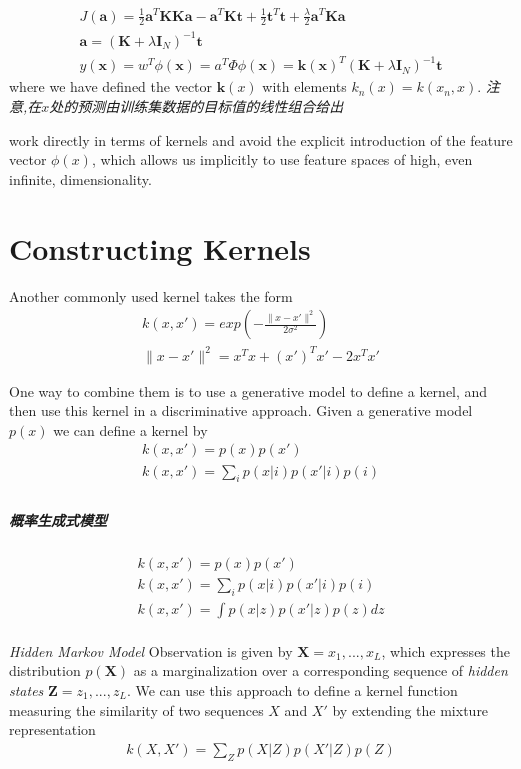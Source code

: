\documentclass[a4paper]{article}
\begin{document}
\begin{align}
J(\mathbf{a}) = \frac{1}{2} \mathbf{a}^T \mathbf{K} \mathbf{K} \mathbf{a} - \mathbf{a}^T
  \mathbf{K} \mathbf{t} + \frac{1}{2} \mathbf{t}^T
  \mathbf{t} + \frac{\lambda}{2} \mathbf{a}^T \mathbf{K} \mathbf{a}
\\
\mathbf{a} = (\mathbf{K} + \lambda \mathit{\mathbf{I}_N})^{-1} \mathbf{t}
\\
y(\mathbf{x}) = w^T\phi(\mathbf{x}) = a^T\Phi\phi(\mathbf{x}) = \mathbf{k}(\mathbf{x})^T (\mathbf{K} + \lambda \mathit{\mathbf{I}_N})^{-1} \mathbf{t}
\end{align}
where we have defined the vector $\mathbf{k}(x)$ with elements $k_n(x) = k(x_n, x)$.
\emph{注意,在$x$处的预测由训练集数据的目标值的线性组合给出}

work directly in terms of kernels and avoid the explicit introduction of the feature vector $\phi(x)$, which allows us implicitly to use feature spaces of high, even infinite, dimensionality.

\section{Constructing Kernels}
Another commonly used kernel takes the form
\begin{align}
k(x, x') = exp(-\frac{\|x-x'\|^2}{2\sigma^2})\\
\|x-x'\|^2 = x^Tx+(x')^Tx' -2x^Tx'
\end{align}

One way to combine them is to use a generative model to define a kernel, and then use this kernel in a discriminative approach.
Given a generative model $p(x)$ we can define a kernel by
\begin{align}
k(x, x') = p(x)p(x')\\
k(x, x') = \sum_{i}p(x|i)p(x'|i)p(i)\\
\end{align}

\subparagraph{概率生成式模型}
\begin{align*}
  k(x, x') = p(x)p(x')\\
  k(x, x') = \sum_i p(x|i)p(x'|i)p(i)\\
  k(x, x') = \int p(x|z)p(x'|z)p(z)dz\\
\end{align*}

\emph{Hidden Markov Model}
Observation is given by $\mathbf{X} = {x_1,...,x_L}$, which expresses the distribution $p(\mathbf{X})$ as a marginalization over a corresponding sequence of \emph{hidden states} $\mathbf{Z} = {z_1,...,z_L}$. We can use this approach to define a kernel function measuring the similarity of two sequences $X$ and $X'$ by extending the mixture representation
\begin{align}
k(X, X') = \sum_{Z}p(X|Z)p(X'|Z)p(Z)
\end{align}
\end{document}
